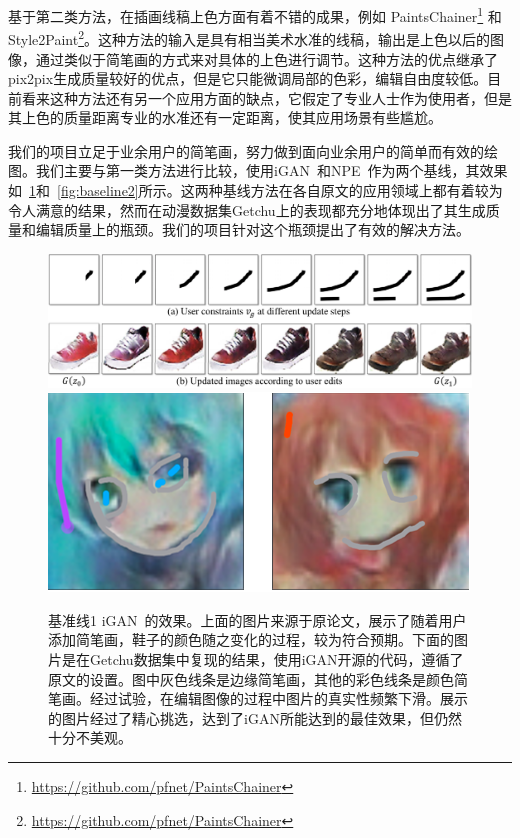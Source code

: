 \documentclass[a4paper,12pt,UTF8]{ctexart}
\newcommand{\kai}{\CJKfamily{zhkai}}	%
\begin{document}
基于第二类方法，在插画线稿上色方面有着不错的成果，例如 PaintsChainer\footnote{\url{https://github.com/pfnet/PaintsChainer}} 和 Style2Paint\footnote{\url{https://github.com/pfnet/PaintsChainer}}。这种方法的输入是具有相当美术水准的线稿，输出是上色以后的图像，通过类似于简笔画的方式来对具体的上色进行调节。这种方法的优点继承了pix2pix生成质量较好的优点，但是它只能微调局部的色彩，编辑自由度较低。目前看来这种方法还有另一个应用方面的缺点，它假定了专业人士作为使用者，但是其上色的质量距离专业的水准还有一定距离，使其应用场景有些尴尬。

我们的项目立足于业余用户的简笔画，努力做到面向业余用户的简单而有效的绘图。我们主要与第一类方法进行比较，使用iGAN~\cite{Zhu2016Generative}和NPE~\cite{Brock2016Neural}作为两个基线，其效果如~\ref{fig:baseline1}和~\ref{fig:baseline2}所示。这两种基线方法在各自原文的应用领域上都有着较为令人满意的结果，然而在动漫数据集Getchu上的表现都充分地体现出了其生成质量和编辑质量上的瓶颈。我们的项目针对这个瓶颈提出了有效的解决方法。

\begin{figure}[H]
  \centering
  \includegraphics[width=0.9\linewidth]{figs/baseline_shoe.PNG}
  \includegraphics[width=0.9\linewidth]{figs/baseline1.PNG}
  \caption{\kai 基准线1 iGAN~\cite{Zhu2016Generative}的效果。上面的图片来源于原论文，展示了随着用户添加简笔画，鞋子的颜色随之变化的过程，较为符合预期。下面的图片是在Getchu数据集中复现的结果，使用iGAN开源的代码，遵循了原文的设置。图中灰色线条是边缘简笔画，其他的彩色线条是颜色简笔画。经过试验，在编辑图像的过程中图片的真实性频繁下滑。展示的图片经过了精心挑选，达到了iGAN所能达到的最佳效果，但仍然十分不美观。}
  \label{fig:baseline1}
\end{figure}
\end{document}
